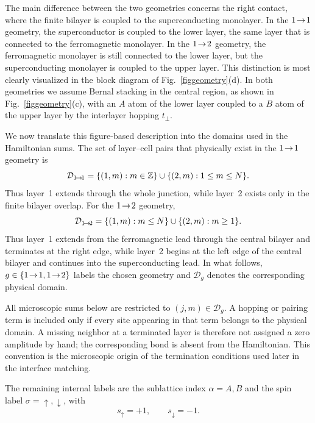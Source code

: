 The main difference between the two geometries concerns the right contact, where the finite bilayer is coupled to the superconducting monolayer.  In the $1\!\to\!1$ geometry, the superconductor is coupled to the lower layer, the same layer that is connected to the ferromagnetic monolayer.  In the $1\!\to\!2$ geometry, the ferromagnetic monolayer is still connected to the lower layer, but the superconducting monolayer is coupled to the upper layer.  This distinction is most clearly visualized in the block diagram of Fig.~\ref{figgeometry}(d).  In both geometries we assume Bernal stacking in the central region, as shown in Fig.~\ref{figgeometry}(c), with an $A$ atom of the lower layer coupled to a $B$ atom of the upper layer by the interlayer hopping $t_\perp$.

We now translate this figure-based description into the domains used in the Hamiltonian sums.  The set of layer--cell pairs that physically exist in the $1\!\to\!1$ geometry is
\begin{equation}
	\mathcal D_{1\!\to\!1}
	=
	\{(1,m):m\in\mathbb Z\}
	\cup
	\{(2,m):1\le m\le N\}.
	\label{eq:domain-11}
\end{equation}
Thus layer~1 extends through the whole junction, while layer~2 exists only in the finite bilayer overlap.  For the $1\!\to\!2$ geometry,
\begin{equation}
	\mathcal D_{1\!\to\!2}
	=
	\{(1,m):m\le N\}
	\cup
	\{(2,m):m\ge 1\}.
	\label{eq:domain-12}
\end{equation}
Thus layer~1 extends from the ferromagnetic lead through the central bilayer and terminates at the right edge, while layer~2 begins at the left edge of the central bilayer and continues into the superconducting lead.  In what follows, $g\in\{1\!\to\!1,1\!\to\!2\}$ labels the chosen geometry and $\mathcal D_g$ denotes the corresponding physical domain.

All microscopic sums below are restricted to $(j,m)\in\mathcal D_g$.  A hopping or pairing term is included only if every site appearing in that term belongs to the physical domain.  A missing neighbor at a terminated layer is therefore not assigned a zero amplitude by hand; the corresponding bond is absent from the Hamiltonian.  This convention is the microscopic origin of the termination conditions used later in the interface matching.

The remaining internal labels are the sublattice index $\alpha=A,B$ and the spin label $\sigma=\uparrow,\downarrow$, with
\begin{equation}
	s_\uparrow=+1,
	\qquad
	s_\downarrow=-1.
\end{equation}

